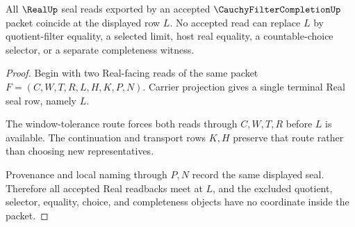 \begin{theorem}
\label{thm:cauchy-filter-completion-real-seal-uniqueness-route}
All $\RealUp$ seal reads exported by an accepted $\CauchyFilterCompletionUp$ packet coincide at the displayed row $L$. No accepted read can replace $L$ by quotient-filter equality, a selected limit, host real equality, a countable-choice selector, or a separate completeness witness.
\end{theorem}
\begin{proof}
Begin with two Real-facing reads of the same packet $F=(C,W,T,R,L,H,K,P,N)$. Carrier projection gives a single terminal Real seal row, namely $L$.

The window-tolerance route forces both reads through $C,W,T,R$ before $L$ is available. The continuation and transport rows $K,H$ preserve that route rather than choosing new representatives.

Provenance and local naming through $P,N$ record the same displayed seal. Therefore all accepted Real readbacks meet at $L$, and the excluded quotient, selector, equality, choice, and completeness objects have no coordinate inside the packet.
\end{proof}

